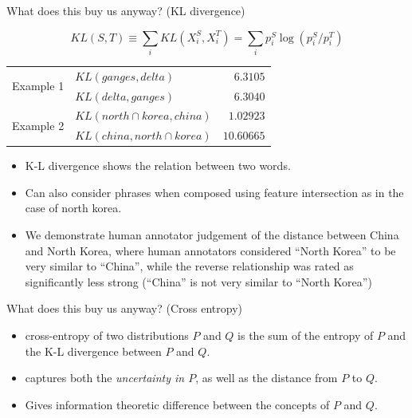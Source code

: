 \documentclass[8pt]{beamer}
\begin{document}
\begin{frame}{What does this buy us anyway? (KL divergence)}


\begin{equation*}
     KL(S, T) \equiv \sum_i KL(X^S_i, X^T_i) =  \sum_i p^S_i \log \left( p^S_i / p^T_i \right)
\end{equation*}


\begin{tabular}{clr}
    \multirow{2}{*}{Example 1} & $KL(ganges, delta)$ & $6.3105$  \\
                               & $KL(delta, ganges)$ & $6.3040$  \\
    \multirow{2}{*}{Example 2} & $KL(north \cap korea, china)$ & $1.02923$ \\
                               & $KL(china, north \cap korea)$ & $10.60665$
\end{tabular}

\begin{itemize}
\item  K-L divergence shows the relation
between two words.
\item Can also consider phrases when composed using feature intersection as in the case of
north korea.
\item We demonstrate human annotator judgement of the distance between China
and North Korea, where human annotators considered ``North Korea'' to be very similar to
``China'', while the reverse relationship was rated as significantly less strong (``China'' is not
very similar to ``North Korea'')
\end{itemize}
\end{frame}

\begin{frame}{What does this buy us anyway? (Cross entropy)}

\begin{itemize}
\item cross-entropy of two distributions $P$ and $Q$ is the sum of the entropy of
$P$ and the K-L divergence between $P$ and $Q$. 
\item captures both the \emph{uncertainty in $P$}, as well as the distance from $P$ to $Q$.
\item Gives information theoretic difference between the concepts
of $P$ and $Q$.
\end{itemize}
\end{frame}
\end{document}
